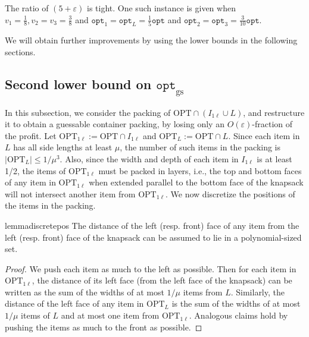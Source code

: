 \documentclass[10pt,a4paper]{amsart}
\newcommand{\mt}[1]{#1}
\newcommand{\eps}{\varepsilon}
\renewcommand{\epsilon}{\varepsilon} %
\theoremstyle{definition}
\newcommand{\hmax}{\mu}
\newcommand{\opt}{\mathtt{opt}}
\newcommand{\optgs}{\mathtt{opt}_{\mathrm{gs}}}
\newcommand{\OPT}{\mathrm{OPT}}
\newcommand{\OPTonel}{\text{OPT}_{1\ell}}
\newcommand{\OPTL}{\text{OPT}_L}
\begin{document}

\mt{The ratio of $(5+\eps)$ is tight. One such instance is given when $v_1 =\frac{1}{8}, v_2=v_3=\frac{3}{8} $ and $\opt_1=\opt_L=\frac{1}{5}\opt$ and $\opt_2=\opt_3=\frac{3}{10}\opt.$ }

We will obtain further improvements by using the lower bounds in the following sections.


\subsection{Second lower bound on \texorpdfstring{$\optgs$}{optgs}}
\label{sec:secondlb}
In this subsection, we consider the packing of $\OPT\cap (I_{1\ell}\cup L)$, and restructure it to obtain a guessable container packing, by losing only an $O(\epsilon)$-fraction of the profit. 
Let $\OPTonel := \OPT\cap I_{1\ell}$ and $\OPTL := \OPT\cap L$. Since each item in $L$ has all side lengths at least $\hmax$, the number of such items in the packing is $|\OPTL| \le 1/\hmax^3$. 
Also, since the width and depth
of each item in $I_{1\ell}$ is at least 1/2, the items of $\OPTonel$ must be packed in layers, i.e., the top and bottom faces of any item in $\OPTonel$ when extended parallel to the bottom face of the knapsack will not intersect another item from $\OPTonel$. We now discretize the positions of the items in the packing.

\begin{restatable}{lemma}{discretepos}
\label{lem:discretepos}
    The distance of the left (resp. front) face of any item from the left (resp. front) face of the knapsack can be assumed to lie in a polynomial-sized set.
\end{restatable}
\begin{proof}
We push each item as much to the left as possible. Then for each item in $\OPTonel$, the distance of its left face (from the left face of the knapsack) can be written as the sum of the widths of at most $1/\hmax$ items from $L$. Similarly, the distance of the left face of any item in $\OPTL$ is the sum of the widths of at most $1/\hmax$ items of $L$ and at most one item from $\OPTonel$. Analogous claims hold by pushing the items as much to the front as possible.
\end{proof}
\end{document}
